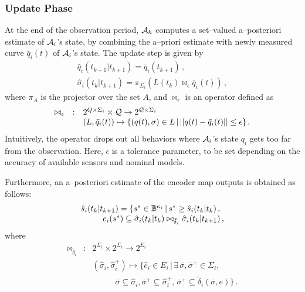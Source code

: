 \documentclass[journal, onecolumn, 12pt]{styles/IEEEtran}
\begin{document}
\subsubsection{Update Phase} 

At the end of the observation period, $\mathcal{A}_h$ computes a set--valued a--posteriori estimate of $\mathcal{A}_i$'s state, by combining the a--priori estimate with newly measured curve $\bar{q}_i(t)$ of $\mathcal{A}_i$'s state. The update step is given by
$$
\begin{array}{l}
\hat{q}_i(t_{k+1}|t_{k+1}) = \bar{q}_i(t_{k+1}) \, , \\
\hat{\sigma}_i(t_{k}|t_{k+1}) = \pi_{\Sigma_i} (L(t_k) \bowtie_\epsilon \bar{q}_i(t) ) \, , 
\end{array}
$$
where $\pi_A$ is the projector over the set $A$, and $\bowtie_\epsilon$ is an operator defined as
\begin{equation*}
\begin{array}{rcl}
\bowtie_\epsilon & : & 2^{Q \times \Sigma_i} \times \mathcal{Q}  \rightarrow 2^{\mathcal{Q} \times \Sigma_i} \\
& & (L, \bar{q}_i(t)) \mapsto \{(q(t), \sigma) \in L \, | \, ||q(t)-\bar{q}_i(t)|| \leq \epsilon \} \, .
\end{array}
\end{equation*}
Intuitively, the operator  drops out all behaviors where $\mathcal{A}_i$'s state $q_i$ gets too far from the observation. Here, $\epsilon$ is a tolerance parameter, to be set depending on the accuracy of available sensors and nominal models.

Furthermore, an a--posteriori estimate of the encoder map outputs is obtained as follows:
$$
\begin{array}{l}
\hat{s}_i(t_{k}|t_{k+1}) = \{s^* \in \Bbb{B}^{\kappa_i} \, | \, s^* \geq \hat{s}_i(t_{k}|t_{k}) \, , \\ 
\;\;\;\;\;\;\;\;\; \, e_i(s^*) \subseteq \hat{\sigma}_i(t_{k}|t_{k}) \bowtie_{\tilde{\delta}_i} \hat{\sigma}_i(t_{k}|t_{k+1})
\, ,
\end{array}
$$
where
$$
\begin{array}{rcl}
\bowtie_{\tilde{\delta}_i} & : & 2^{\Sigma_i} \times 2^{\Sigma_i} \rightarrow 2^{E_i} \\
& & (\hat{\sigma}_i, \hat{\sigma}_i^+) \mapsto \{  \hat{e}_i \in E_i \, | \, \exists \, \bar{\sigma}, \bar\sigma^+ \in \Sigma_i, \\ 
& & \;\;\;\;\;\;\;\;\;\; \bar\sigma \subseteq \hat{\sigma}_i, \bar\sigma^+ \subseteq \hat{\sigma}_i^+ , \,  \bar\sigma^+ \subseteq \tilde{\delta}_i(\bar\sigma, e) \}
\, .
\end{array}
$$
\end{document}
